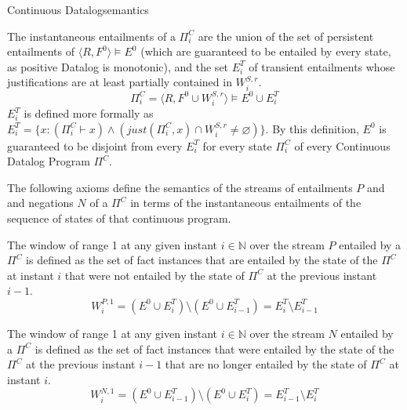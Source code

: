 \begin{nestedsection}{Continuous Datalog}{semantics}
\begin{definition}[State of a $\Pi^C$]
The instantaneous entailments of a $\Pi^C_i$ are the union of the set of
persistent entailments of ${\langle R, F^0 \rangle \vDash E^0}$ (which are
guaranteed to be entailed by every state, as positive Datalog is monotonic),
and the set $E^T_{i}$ of transient entailments whose justifications are at
least partially contained in $W^{S,r}_i$.
\begin{equation*}
\Pi^C_i = \langle R, F^0 \cup W^{S,r}_{i} \rangle \vDash E^0 \cup E^T_{i}
\end{equation*}
$E^T_i$ is defined more formally as
${E^T_{i} = \{ x : \left( \Pi^C_i \vdash x \right) \wedge
\left( just(\Pi^C_i,x) \cap W^{S,r}_i \neq \varnothing \right) \}}$.
By this definition, $E^0$ is guaranteed to be disjoint from every $E^T_i$
for every state $\Pi^C_i$ of every Continuous Datalog Program $\Pi^C$.
\end{definition}

The following axioms define the semantics of the streams of
entailments $P$ and and negations $N$ of a $\Pi^C$ in terms of the
instantaneous entailments of the sequence of states of that continuous
program.

\begin{axiom}
\label{axiom:continuous datalog: positive window increment}
The window of range 1 at any given instant ${i \in \mathbb{N}}$ over
the stream $P$ entailed by a $\Pi^C$ is defined as the set of fact instances
that are entailed by the state of the $\Pi^C$ at instant $i$ that were
not entailed by the state of $\Pi^C$ at the previous instant ${i-1}$.
\begin{equation*}
W^{P,1}_{i} = \left( E^0 \cup E^T_{i} \right) \setminus
\left( E^0 \cup E^T_{i-1} \right) = E^T_{i} \setminus E^T_{i-1}
\end{equation*}
\end{axiom}
\begin{axiom}
\label{axiom:continuous datalog: negative window increment}
The window of range 1 at any given instant ${i \in \mathbb{N}}$ over
the stream $N$ entailed by a $\Pi^C$ is defined as the set of fact instances
that were entailed by the state of the $\Pi^C$ at the previous instant
${i-1}$ that are no longer entailed by the state of $\Pi^C$ at instant $i$.
\begin{equation*}
W^{N,1}_{i} = \left( E^0 \cup E^T_{i-1} \right) \setminus
\left( E^0 \cup E^T_{i} \right) = E^T_{i-1} \setminus E^T_{i}
\end{equation*}
\end{axiom}


\end{nestedsection}
